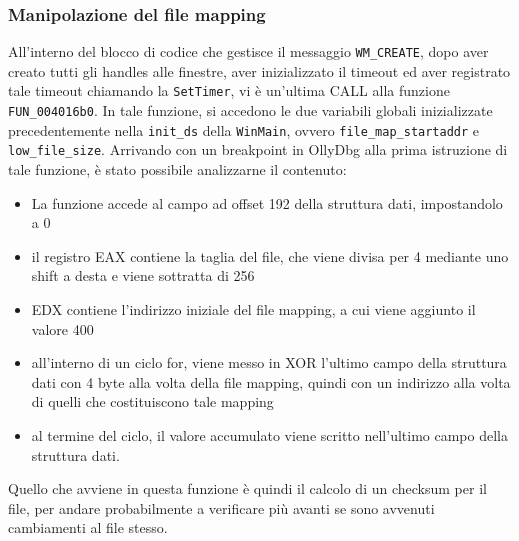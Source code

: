 \documentclass{article}
\begin{document}
\subsubsection{Manipolazione del file mapping}
All'interno del blocco di codice che gestisce il messaggio \texttt{WM\_CREATE}, dopo aver creato tutti gli handles alle finestre, aver inizializzato il timeout ed aver registrato tale timeout chiamando la \texttt{SetTimer}, vi è un'ultima CALL alla funzione \texttt{FUN\_004016b0}. In tale funzione, si accedono le due variabili globali inizializzate precedentemente nella \texttt{init\_ds} della \texttt{WinMain}, ovvero \texttt{file\_map\_startaddr} e \texttt{low\_file\_size}. Arrivando con un breakpoint in OllyDbg alla prima istruzione di tale funzione, è stato possibile analizzarne il contenuto:
\begin{itemize}
\item La funzione accede al campo ad offset 192 della struttura dati, impostandolo a 0
\item il registro EAX contiene la taglia del file, che viene divisa per 4 mediante uno shift a desta e viene sottratta di 256
\item EDX contiene l'indirizzo iniziale del file mapping, a cui viene aggiunto il valore 400
\item all'interno di un ciclo for, viene messo in XOR l'ultimo campo della struttura dati con 4 byte alla volta della file mapping, quindi con un indirizzo alla volta di quelli che costituiscono tale mapping
\item al termine del ciclo, il valore accumulato viene scritto nell'ultimo campo della struttura dati.
\end{itemize}
Quello che avviene in questa funzione è quindi il calcolo di un checksum per il file, per andare probabilmente a verificare più avanti se sono avvenuti cambiamenti al file stesso.
\end{document}
